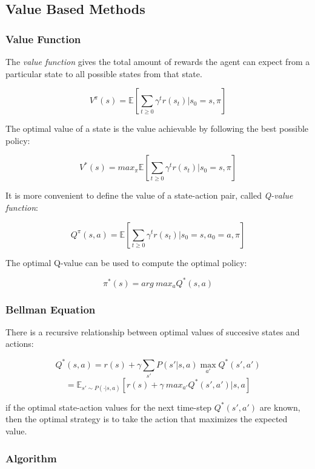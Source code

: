 \documentclass[11pt]{article}
\begin{document}
\subsection{Value Based Methods}\label{value-based-methods}

\subsubsection{Value Function}\label{value-function}

The \emph{value function} gives the total amount of rewards the agent
can expect from a particular state to all possible states from that
state.

\[V^{\pi}(s)=\mathbb{E}[\sum_{t\ge 0}\gamma^t r(s_t)|s_0 = s, \pi]\]

The optimal value of a state is the value achievable by following the
best possible policy:

\[V^*(s)=max_{\pi}\mathbb{E}[\sum_{t\ge 0}\gamma^t r(s_t)|s_0 = s, \pi]\]

It is more convenient to define the value of a state-action pair, called
\emph{Q-value function}:

\[Q^{\pi}(s, a)= \mathbb{E}[\sum_{t\ge 0}\gamma^t r(s_t)|s_0=s, a_0=a, \pi]\]

The optimal Q-value can be used to compute the optimal policy:

\[\pi^*(s)=arg\ max_aQ^*(s, a)\]

\subsubsection{Bellman Equation}\label{bellman-equation}

There is a recursive relationship between optimal values of succesive
states and actions:

\[Q^*(s, a)=r(s)+\gamma \sum_{s'}P(s'|s, a)\max_{a'}Q^*(s', a')\]
\[=\mathbb{E}_{s'\sim P(\cdot|s, a)}[r(s)+\gamma\ max_{a'}Q^*(s', a')|s, a]\]

if the optimal state-action values for the next time-step
\(Q^*(s', a')\) are known, then the optimal strategy is to take the
action that maximizes the expected value.

\subsubsection{Algorithm}\label{algorithm}
\end{document}

